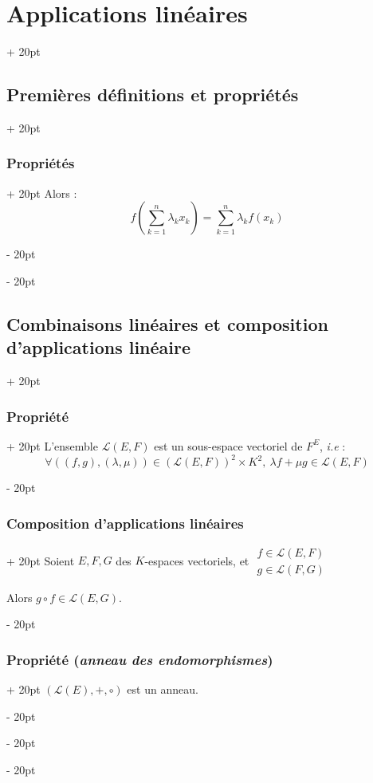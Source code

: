 \documentclass[a4paper, 12pt, twoside]{article}
\newcommand{\lr}[1]{\left( #1 \right)}
\newcommand{\ind}[1][20pt]{\advance\leftskip + #1}
\newcommand{\deind}[1][20pt]{\advance\leftskip - #1}
\newenvironment{indt}[2][20pt]{#2 \par \ind[#1]}{\par \deind} %
\begin{document}
\begin{indt}{\section{Applications linéaires}}
\begin{indt}{\subsection{Premières définitions et propriétés}}
\begin{indt}{\subsubsection{Propriétés}}
                Alors :
                \[
                    f\!\lr{\sum_{k = 1}^n \lambda_k x_k} = \sum_{k = 1}^n \lambda_k f(x_k)
                \]
            \end{indt}
        \end{indt}

        \vspace{12pt}
        
        \begin{indt}{\subsection{Combinaisons linéaires et composition d'applications linéaire}}
            \begin{indt}{\subsubsection{Propriété}}
                L'ensemble $\mathcal L(E, F)$ est un sous-espace vectoriel de $F^E$, \textit{i.e} :
                \[
                    \forall ((f, g), (\lambda, \mu)) \in \lr{\mathcal L(E, F)}^2 \times K^2,\
                    \lambda f + \mu g \in \mathcal L(E, F)
                \]
            \end{indt}

            \vspace{12pt}
            
            \begin{indt}{\subsubsection{Composition d'applications linéaires}}
                Soient $E, F, G$ des $K$-espaces vectoriels, et
                $
                    \begin{array}{|l}
                        f \in \mathcal L(E, F)
                        \\
                        g \in \mathcal L(F, G)
                    \end{array}
                $

                Alors $g \circ f \in \mathcal L(E, G)$.
            \end{indt}

            \vspace{12pt}
            
            \begin{indt}{\subsubsection{Propriété (\textit{anneau des endomorphismes})}}
                $(\mathcal L(E), +, \circ)$ est un anneau.


\end{indt}
\end{indt}
\end{indt}
\end{document}
